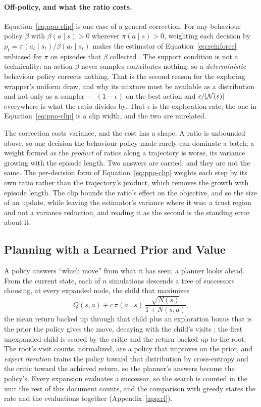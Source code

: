 \documentclass[11pt,a4paper]{article}
\begin{document}
\paragraph{Off-policy, and what the ratio costs.}
Equation~\ref{eq:ppo-clip} is one case of a general correction. For any
behaviour policy $\beta$ with $\beta(a \mid s) > 0$ wherever $\pi(a \mid s) >
0$, weighting each decision by $\rho_t = \pi(a_t \mid s_t) / \beta(a_t \mid
s_t)$ makes the estimator of Equation~\ref{eq:reinforce} unbiased for $\pi$ on
episodes that $\beta$ collected \citep{suttonbarto2018}. The support condition
is not a technicality: an action $\beta$ never samples contributes nothing, so
a \emph{deterministic} behaviour policy corrects nothing. That is the second
reason for the exploring wrapper's uniform draw, and why its mixture must be
available as a distribution and not only as a sampler --- $(1 - \epsilon)$ on
the best action and $\epsilon / |\mathcal{N}(s)|$ everywhere is what the
ratio divides by. That $\epsilon$ is the exploration rate; the one in
Equation~\ref{eq:ppo-clip} is a clip width, and the two are unrelated.

The correction costs variance, and the cost has a shape. A ratio is unbounded
above, so one decision the behaviour policy made rarely can dominate a batch;
a weight formed as the \emph{product} of ratios along a trajectory is worse,
its variance growing with the episode length. Two answers are carried, and
they are not the same. The per-decision form of Equation~\ref{eq:ppo-clip}
weights each step by its own ratio rather than the trajectory's product, which
removes the growth with episode length. The clip bounds the ratio's effect on
the objective, and so the size of an update, while leaving the estimator's
variance where it was: a trust region and not a variance reduction, and
reading it as the second is the standing error about it.

\subsection{Planning with a Learned Prior and Value}
\label{sec:planning}
A policy answers ``which move'' from what it has seen; a planner looks
ahead. From the current state, each of $n$ simulations descends a tree of
successors choosing, at every expanded node, the child that maximizes
\begin{equation}
  Q(s, a) + c\, \pi(a \mid s)\, \frac{\sqrt{N(s)}}{1 + N(s, a)},
  \label{eq:puct}
\end{equation}
the mean return backed up through that child plus an exploration bonus that
is the prior the policy gives the move, decaying with the child's visits
\citep{silver2017}; the first unexpanded child is scored by the critic and the
return backed up to the root. The root's visit counts, normalized, are a
policy that improves on the prior, and \emph{expert iteration}
\citep{anthony2017} trains the policy toward that distribution by cross-entropy
and the critic toward the achieved return, so the planner's answers become the
policy's. Every expansion evaluates a successor, so the search is counted in
the unit the rest of this document counts, and the comparison with greedy
states the rate and the evaluations together (Appendix~\ref{app:rl}).
\end{document}
